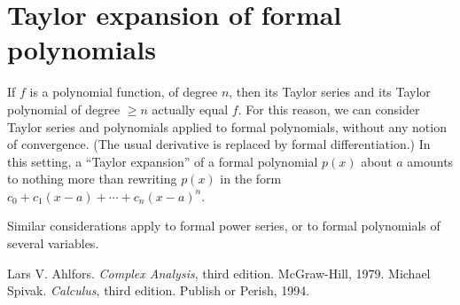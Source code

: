 \documentclass{article}
\begin{document}
\section{Taylor expansion of formal polynomials}
If $f$ is a polynomial function, of degree $n$,
then its Taylor series and its Taylor polynomial of degree $\geq n$
actually equal $f$.  For this reason, we can consider Taylor series and polynomials
applied to formal polynomials, without any notion of convergence.
(The usual derivative is replaced by formal differentiation.)
In this setting, a ``Taylor expansion'' of a formal polynomial $p(x)$
about $a$ amounts to nothing more than rewriting $p(x)$
in the form $c_0 + c_1 (x-a) + \dotsb + c_n (x-a)^n$.

Similar considerations apply to formal power series,
or to formal polynomials of several variables.



\begin{thebibliography}{3}
Lars V. Ahlfors. {\it Complex Analysis}, third edition. McGraw-Hill, 1979.
Michael Spivak. {\it Calculus}, third edition. Publish or Perish, 1994.
\end{thebibliography}
\end{document}
